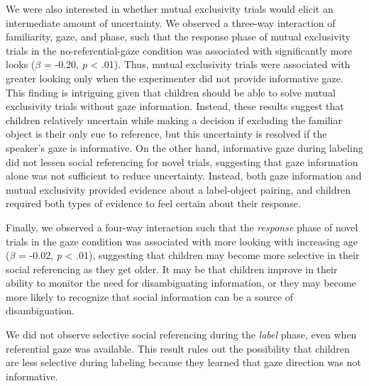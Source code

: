 \documentclass[a4paper,man,apacite,floatsintext]{apa6}
\begin{document}
We were also interested in whether mutual exclusivity trials would
elicit an intermediate amount of uncertainty. We observed a three-way
interaction of familiarity, gaze, and phase, such that the response
phase of mutual exclusivity trials in the no-referential-gaze condition
was associated with significantly more looks (\(\beta\) = -0.20,
\emph{p} \textless{} .01). Thus, mutual exclusivity trials were
associated with greater looking only when the experimenter did not
provide informative gaze. This finding is intriguing given that children
should be able to solve mutual exclusivity trials without gaze
information. Instead, these results suggest that children relatively
uncertain while making a decision if excluding the familiar object is
their only cue to reference, but this uncertainty is resolved if the
speaker's gaze is informative. On the other hand, informative gaze
during labeling did not lessen social referencing for novel trials,
suggesting that gaze information alone was not sufficient to reduce
uncertainty. Instead, both gaze information and mutual exclusivity
provided evidence about a label-object pairing, and children required
both types of evidence to feel certain about their response.

Finally, we observed a four-way interaction such that the
\emph{response} phase of novel trials in the gaze condition was
associated with more looking with increasing age (\(\beta\) = -0.02,
\emph{p} \textless{} .01), suggesting that children may become more
selective in their social referencing as they get older. It may be that
children improve in their ability to monitor the need for disambiguating
information, or they may become more likely to recognize that social
information can be a source of disambiguation.

We did not observe selective social referencing during the \emph{label}
phase, even when referential gaze was available. This result rules out
the possibility that children are less selective during labeling because
they learned that gaze direction was not informative.
\end{document}

